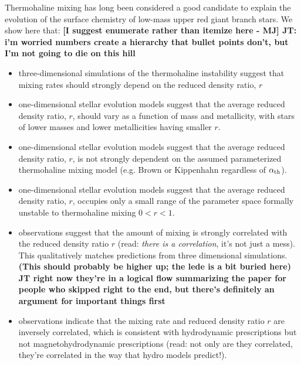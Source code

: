Thermohaline mixing has long been considered a good candidate to explain the evolution of the surface chemistry of low-mass upper red giant branch stars. We show here that:
\textbf{[I suggest enumerate rather than itemize here - MJ] JT: i'm worried numbers create a hierarchy that bullet points don't, but I'm not going to die on this hill}
\begin{itemize}
    \item three-dimensional simulations of the thermohaline instability suggest that mixing rates should strongly depend on the reduced density ratio, $r$
    
    \item one-dimensional stellar evolution models suggest that the average reduced density ratio, $r$, should vary as a function of mass and metallicity, with stars of lower masses and lower metallicities having smaller $r$.
    
    \item one-dimensional stellar evolution models suggest that the average reduced density ratio, $r$, is not strongly dependent on the assumed parameterized thermohaline mixing model (e.g. Brown or Kippenhahn regardless of $\alpha_{\rm th}$).
    
    \item one-dimensional stellar evolution models suggest that the average reduced density ratio, $r$, occupies only a small range of the parameter space formally unstable to thermohaline mixing $0<r<1$.
    
    \item observations suggest that the amount of mixing is strongly correlated with the reduced density ratio $r$ (read: \emph{there is a correlation}, it's not just a mess). This qualitatively matches predictions from three dimensional simulations. {\bf (This should probably be higher up; the lede is a bit buried here) JT right now they're in a logical flow summarizing the paper for people who skipped right to the end, but there's definitely an argument for important things first}
    
    \item observations indicate that the mixing rate and reduced density ratio $r$ are inversely correlated, which is consistent with hydrodynamic prescriptions but not magnetohydrodynamic prescriptions (read: not only are they correlated, they're correlated in the way that hydro models predict!).
    
    \end{itemize}



